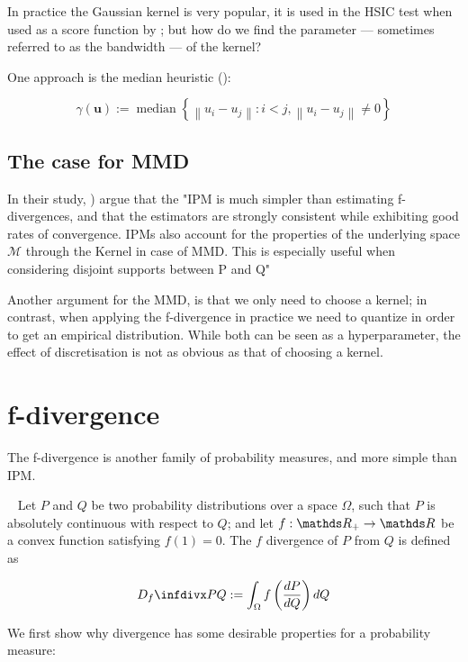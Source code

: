 In practice the Gaussian kernel is very popular, it is used in the HSIC test when used as a
score function by \cite{Mooij2016jmlr}; but how do we find the parameter --- sometimes referred to 
as the bandwidth --- of the kernel?

One approach is the median heuristic (\cite{scholkopf2002learning}):

$$
\hat{\gamma}(\mathbf{u}):=\operatorname{median}\left\{\left\|u_{i}-u_{j}\right\|:  i<j ,\left\|u_{i}-u_{j}\right\| \neq 0\right\}
$$

\subsection{The case for MMD}

In their study, \cite{sriperumbudur2009integral}) argue that the "IPM is much
simpler than estimating f-divergences, and that the estimators
are strongly consistent while exhibiting good rates of convergence. IPMs also account for the properties of
the underlying space $\mathcal{M}$ through the Kernel in case of MMD. This is especially
useful when considering disjoint supports between P and Q"

Another argument for the MMD, is that we only need to choose a kernel; in contrast, 
when applying the f-divergence in practice we need to quantize in order to get an 
empirical distribution. While both can be seen as a hyperparameter, the effect of 
discretisation is not as obvious as that of choosing a kernel. 

\section{f-divergence}

The f-divergence is another family of probability measures, and more simple than IPM.

\begin{definition}[f-divergence]
    ~
Let $P$ and $Q$ be two probability distributions over a space $\Omega$, 
such that $P$ is absolutely continuous with respect to $Q$; and let 
$f: \R_+ \rightarrow \R$ be a convex function satisfying $f(1) = 0$. The $f$ divergence of 
$P$ from $Q$ is defined as

$$
    \infdiv{P}{Q} := \int_\Omega f \left( \frac{dP}{dQ} \right) dQ
$$
    
\end{definition}


We first show why divergence has some desirable properties for a probability measure:


